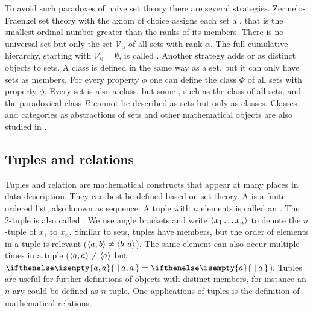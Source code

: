 To avoid such paradoxes of naive set theory there are several strategies.
Zermelo-Fraenkel set theory with the axiom of choice assigns each set a
, that is the smallest ordinal number greater than
the ranks of its members. There is no universal set but only the set
$\mathcal{V}_\alpha$ of all sets with rank $\alpha$. The full cumulative
hierarchy, starting with $\mathcal{V}_0 = \emptyset$, is called . Another strategy adds 
or  as distinct objects to sets. A class is defined
in the same way as a set, but it can only have sets as members. For every
property $\phi$ one can define the class $\Phi$ of all sets with property
$\phi$. Every set is also a class, but some , such as the class of all sets, and the paradoxical class $R$ cannot
be described as sets but only as classes. Classes and categories as
abstractions of sets and other mathematical objects are also studied in
.






\subsection{Tuples and relations}
\label{sec:relations}

Tuples and relation are mathematical constructs that appear at many places in
data description. They can best be defined based on set theory. A 
is a finite ordered list, also known as sequence. A tuple with $n$ elements is
called an . The 2-tuple is also called . We
use angle brackets and write $\langle x_1 \ldots x_n \rangle$ to denote the $n$-tuple
of $x_1$ to $x_n$. Similar to sets, tuples have members, but the order of
elements in a tuple is relevant ($\langle a,b \rangle \neq \langle b,a \rangle$). The same
element can also occur multiple times in a tuple ($\langle a,a \rangle \neq \langle a \rangle$ but
$\set{a,a} = \set{a}$).  Tuples are useful for further definitions of objects
with distinct members, for instance an $n$-ary  could be
defined as $n$-tuple. One applications of tuples is the definition of
mathematical relations.

